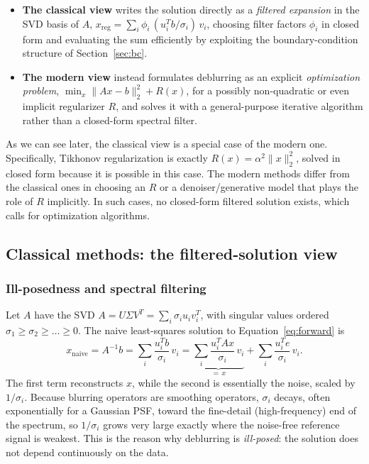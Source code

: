 \documentclass[12pt, a4paper, onecolumn]{article}
\theoremstyle{plain}          %
\theoremstyle{definition}     %
\theoremstyle{remark}
\begin{document}
\begin{itemize}
    \item \textbf{The classical view} writes the solution directly as a \emph{filtered
    expansion} in the SVD basis of $A$, $x_{\text{reg}} = \sum_i \phi_i\,
    (u_i^Tb/\sigma_i)\,v_i$, choosing filter factors $\phi_i$ in closed form and evaluating the sum efficiently by exploiting the
    boundary-condition structure of Section~\ref{sec:bc}.
    \item \textbf{The modern view} instead formulates deblurring as an
    explicit \emph{optimization problem}, $\min_x \|Ax-b\|_{2}^2 + R(x)$, for
    a possibly non-quadratic or even implicit regularizer $R$, and solves it with a general-purpose iterative algorithm rather than a closed-form spectral filter.
\end{itemize}

As we can see later, the classical view is a special case of the modern one. Specifically, Tikhonov regularization is exactly $R(x)=\alpha^2\|x\|_2^2$, solved in
closed form because it is possible in this case. The modern methods
differ from the classical ones in choosing an $R$ or a denoiser/generative model that plays the role of $R$ implicitly. In such cases, no closed-form filtered solution exists, which calls for optimization algorithms.

\subsection{Classical methods: the filtered-solution view}
\label{sec:classical}

\subsubsection{Ill-posedness and spectral filtering}
\label{sec:filtering}

Let $A$ have the SVD $A=U\Sigma V^T=\sum_i \sigma_i u_i v_i^T$, with
singular values ordered $\sigma_1\ge\sigma_2\ge\dots\ge0$. The naive
least-squares solution to Equation~\eqref{eq:forward} is
\begin{equation}
    x_{\text{naive}} = A^{-1}b
    = \sum_i \frac{u_i^Tb}{\sigma_i}\,v_i
    = \underbrace{\sum_i \frac{u_i^TAx}{\sigma_i}\,v_i}_{=\,x}
    + \sum_i \frac{u_i^Te}{\sigma_i}\,v_i.
    \label{eq:naive}
\end{equation}
The first term reconstructs $x$, while the second
is essentially the noise, scaled by $1/\sigma_i$. Because blurring operators are smoothing operators, $\sigma_i$ decays, often exponentially for a
Gaussian PSF, toward the fine-detail (high-frequency) end of the
spectrum, so $1/\sigma_i$ grows very large exactly where the noise-free reference signal is weakest. This is the reason why deblurring is
\emph{ill-posed}: the solution does not depend continuously on the data.
\end{document}
